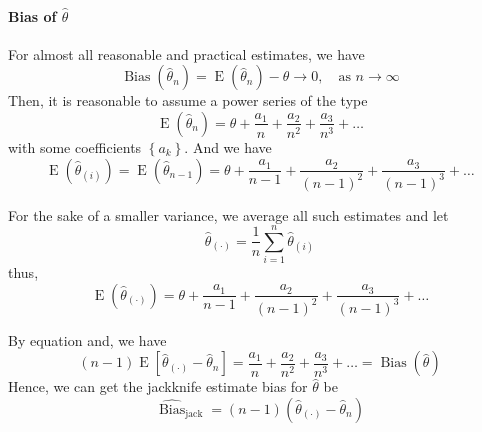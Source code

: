 \paragraph{Bias of $\hat{\theta}$}

For almost all reasonable and practical estimates, we have \begin{equation}
    \operatorname{Bias}(\hat{\theta}_{n})=\operatorname{E}(\hat{\theta}_{n})-\theta\rightarrow 0,\quad\text{as }n\rightarrow\infty
\end{equation}
Then, it is reasonable to assume a power series of the type
\begin{equation}
    \operatorname{E}(\hat{\theta}_{n})=\theta+\frac{a_{1}}{n}+\frac{a_{2}}{n^{2}}+\frac{a_{3}}{n^{3}}+\ldots
\end{equation}
with some coefficients $\left\{a_{k}\right\}$. And we have
\begin{equation}
    \operatorname{E}(\hat{\theta}_{(i)})=\operatorname{E}(\hat{\theta}_{n-1})=\theta+\frac{a_{1}}{n-1}+\frac{a_{2}}{\left(n-1\right)^{2}}+\frac{a_{3}}{\left(n-1\right)^{3}}+\ldots
\end{equation}

For the sake of a smaller variance, we average all such estimates and let
\begin{equation}
    \hat{\theta}_{(\cdot)}=\frac{1}{n}\sum_{i=1}^{n}\hat{\theta}_{(i)}
\end{equation}
thus,
\begin{equation}
    \operatorname{E}(\hat{\theta}_{(\cdot)})=\theta+\frac{a_{1}}{n-1}+\frac{a_{2}}{\left(n-1\right)^{2}}+\frac{a_{3}}{\left(n-1\right)^{3}}+\ldots
\end{equation}

By equation and, we have
\begin{equation}
    (n-1)\operatorname{E}\left[\hat{\theta}_{(\cdot)}-\hat{\theta}_{n}\right]=\frac{a_{1}}{n}+\frac{a_{2}}{n^{2}}+\frac{a_{3}}{n^{3}}+\ldots=\operatorname{Bias}(\hat{\theta})
\end{equation}
Hence, we can get the jackknife estimate bias for $\hat{\theta}$ be
\begin{equation}
    \widehat{\operatorname{Bias}}_{\text{jack}}=(n-1)\left(\hat{\theta}_{(\cdot)}-\hat{\theta}_{n}\right)
\end{equation}


